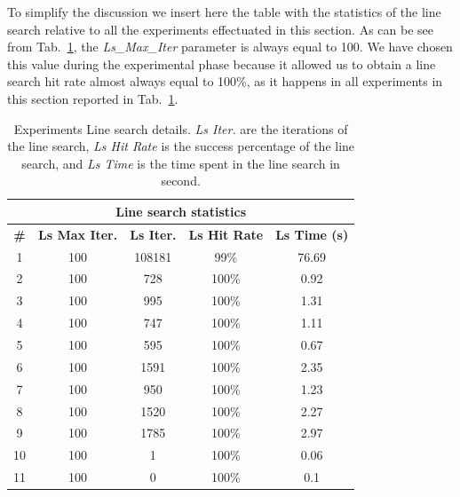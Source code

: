 \documentclass[11pt]{article}
\begin{document}
To simplify the discussion we insert here the table with the statistics of the line search relative to all the experiments effectuated in this section. As can be see from Tab.~\ref{tab:ls_statistics}, the \textit{Ls\_Max\_Iter} parameter is always equal to 100. We have chosen this value during the experimental phase because it allowed us to obtain a line search hit rate almost always equal to 100\%, as it happens in all experiments in this section reported in Tab.~\ref{tab:ls_statistics}.
\begin{table}[H]
\small
    \centering
    \begin{tabular}{ |c|c|c|c|c|}
    \hline
     \multicolumn{5}{|c|}{\textbf{Line search statistics}} \\
      \hline
       \textbf{\#} & \textbf{Ls Max Iter.} & \textbf{Ls Iter.} & \textbf{Ls Hit Rate} & \textbf{Ls Time (s)}\\
     \hline
      1 &  100 & 108181  & 99\% & 76.69 \\
     \hline
      2 &  100 & 728  & 100\% & 0.92\\
     \hline
      3 &  100 & 995 & 100\% & 1.31\\
     \hline
      4 &  100 & 747 & 100\% & 1.11\\
     \hline
      5 &  100 & 595 & 100\% & 0.67\\
     \hline
      6 &  100 & 1591 & 100\% & 2.35\\
     \hline
      7 &  100 & 950 & 100\% & 1.23\\
     \hline
      8 &  100 & 1520 & 100\% & 2.27\\
     \hline
      9 &  100 & 1785 & 100\% & 2.97\\
     \hline
      10 &  100 & 1 & 100\% & 0.06\\
     \hline
      11 &  100 & 0 & 100\% & 0.1\\
     \hline
    \end{tabular}
    \caption{Experiments Line search details. \emph{Ls Iter.} are the iterations of the line search, \emph{Ls Hit Rate} is the success percentage of the line search, and \emph{Ls Time} is the time spent in the line search in second.}
    \label{tab:ls_statistics}
\end{table}
\end{document}
